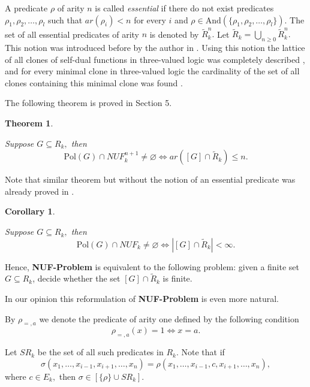 \documentclass{au}
\theoremstyle{plain}
\newtheorem{theorem}{Theorem}
\newtheorem{corollary}{Corollary}
\theoremstyle{definition}
\theoremstyle{remark}
\numberwithin{equation}{section}
\begin{document}
A predicate $\rho$ of arity $n$ is called \textit{essential} if
there do not exist predicates $\rho_{1},\rho_{2},\ldots,\rho_{l}$ such that
$ar(\rho_{i})<n$
for every $i$ and
$\rho \in {
\mathrm{And}
}(\{\rho_{1},\rho_{2},\ldots,\rho_{l}\}).$
The set of all essential predicates of arity $n$ is denoted by $\widetilde R_{k}^{n}.$
Let $\widetilde R_{k} = \bigcup \limits_{n\ge 0} \widetilde R_{k}^{n}.$
This notion was introduced before by the author in \cite{mydm,mybook,Minimal_Clones}.
Using this notion the
lattice of all clones of self-dual functions in three-valued logic
was completely described \cite{SD_DAN, SD_ISMVL,mydm,mybook},
and for every minimal clone in three-valued logic the cardinality of the set of all clones containing
this minimal clone was found \cite{Minimal_Clones}.

The following theorem is proved in Section 5.

\setcounter{nufcounter}{\value{theorem}}

\begin{theorem}\label{NUFmain}

Suppose $G\subseteq R_{k},$ then
$${
\mathrm{Pol}
}(G)\cap NUF_{k}^{n+1}\neq \varnothing \Longleftrightarrow
ar([G] \cap \widetilde R_{k}) \le n .$$

\end{theorem}

Note that similar theorem but without the notion of an essential predicate
was already proved in \cite{pixley,jeavons}.

\begin{corollary}\label{NUFmainCo}

Suppose $G\subseteq R_{k},$ then
$${
\mathrm{Pol}
}(G)\cap NUF_{k}\neq \varnothing \Longleftrightarrow
|[G] \cap \widetilde R_{k}|<\infty.$$

\end{corollary}

Hence, \textbf{NUF-Problem} is equivalent to the following problem:
given a finite set $G\subseteq R_{k}$, decide whether
the set $[G] \cap \widetilde R_{k}$ is finite.

In our opinion this reformulation of \textbf{NUF-Problem} is even more natural.

By $\rho_{=,a}$ we denote the predicate of arity one defined by the following condition
$$\rho_{=,a}(x) = 1 \Longleftrightarrow x = a.$$

Let $SR_{k}$ be the set of all such predicates in $R_{k}.$
Note that if
$$\sigma(x_{1},\ldots,x_{i-1},x_{i+1},\ldots,x_{n}) =
\rho(x_{1},\ldots,x_{i-1},c, x_{i+1},\ldots,x_{n}),$$
where $c \in E_{k},$
then $\sigma \in [\{\rho\}\cup SR_{k}].$
\end{document}
